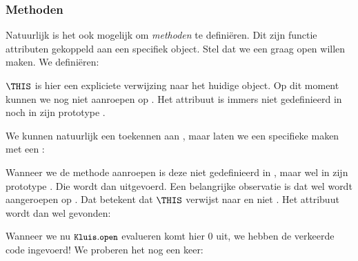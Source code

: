 \subsubsection{Methoden}

Natuurlijk is het ook mogelijk om \emph{methoden} te definiëren. Dit zijn functie attributen gekoppeld aan een specifiek object. Stel dat we een  graag open willen maken. We definiëren:

\begin{codelines}
  \codeLine{\IN \ELSE}
\end{codelines}

$\THIS$ is hier een expliciete verwijzing naar het huidige object. Op dit moment kunnen we  nog niet aanroepen op .
Het attribuut  is immers niet gedefinieerd in  noch in zijn prototype .

We kunnen natuurlijk een  toekennen aan , maar laten we een specifieke  maken met een :

\begin{codelines}
\end{codelines}

Wanneer we de methode  aanroepen is deze niet gedefinieerd in , maar wel in zijn prototype . Die wordt dan uitgevoerd. Een belangrijke observatie is dat  wel wordt aangeroepen op . Dat betekent dat $\THIS$ verwijst naar  en niet . Het attribuut  wordt dan wel gevonden:

\begin{codelines}
\end{codelines}

Wanneer we nu $\text{\ttfamily\small\upshape Kluis}.\text{\ttfamily\small\upshape open}$ evalueren komt hier $0$ uit, we hebben de verkeerde code ingevoerd! We proberen het nog een keer:

\begin{codelines}
\end{codelines}


